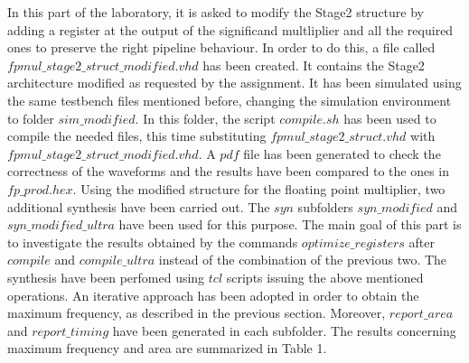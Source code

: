 In this part of the laboratory, it is asked to modify the Stage2 structure by adding a register at the output of the significand multliplier and all the required ones to preserve the right pipeline behaviour. In order to do this, a file called $fpmul\_stage2\_struct\_modified.vhd$ has been created. It contains the Stage2 architecture modified as requested by the assignment. It has been simulated using the same testbench files mentioned before, changing the simulation environment to folder $sim\_modified$. In this folder, the script $compile.sh$ has been used to compile the needed files, this time substituting $fpmul\_stage2\_struct.vhd$ with $fpmul\_stage2\_struct\_modified.vhd$. A $pdf$ file has been generated to check the correctness of the waveforms and the results have been compared to the ones in $fp\_prod.hex$.
\newline
\newline
\noindent Using the modified structure for the floating point multiplier, two additional synthesis have been carried out. The $syn$ subfolders $syn\_modified$ and $syn\_modified\_ultra$ have been used for this purpose. The main goal of this part is to investigate the results obtained by the commands $optimize\_registers$ after $compile$ and $compile\_ultra$ instead of the combination of the previous two. The synthesis have been perfomed using $tcl$ scripts issuing the above mentioned operations. An iterative approach has been adopted in order to obtain the maximum frequency, as described in the previous section. Moreover, $report\_area$ and $report\_timing$ have been generated in each subfolder. The results concerning maximum frequency and area are summarized in Table 1.



